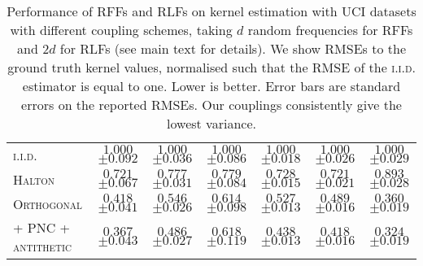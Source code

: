 \begin{table}[t!]
{\begin{tabular}{l c c c c c c}
 \midrule
\scshape{i.i.d.} & $1.000$ {\tiny $\pm 0.092$} & $1.000$ {\tiny $\pm 0.036$} & $1.000$ {\tiny $\pm 0.086$} & $1.000$ {\tiny $\pm 0.018$} & $1.000$ {\tiny $\pm 0.026$} & $1.000$ {\tiny $\pm 0.029$} \\
\scshape{Halton} & $0.721$ {\tiny $\pm 0.067$} & $0.777$ {\tiny $\pm 0.031$} & $0.779$ {\tiny $\pm 0.084$} & $0.728$ {\tiny $\pm 0.015$} & $0.721$ {\tiny $\pm 0.021$} & $0.893$ {\tiny $\pm 0.028$} \\
\scshape{Orthogonal} & $0.418$ {\tiny $\pm 0.041$} & $0.546$ {\tiny $\pm 0.026$} & $\mathbf{0.614}$ {\tiny $\pm 0.098$} & $0.527$ {\tiny $\pm 0.013$} & $0.489$ {\tiny $\pm 0.016$} & $0.360$ {\tiny $\pm 0.019$} \\
\scshape{+ PNC + antithetic} & $\mathbf{0.367}$ {\tiny $\pm 0.043$} & $\mathbf{0.486}$ {\tiny $\pm 0.027$} & $\mathbf{0.618}$ {\tiny $\pm 0.119$} & $\mathbf{0.438}$ {\tiny $\pm 0.013$} & $\mathbf{0.418}$ {\tiny $\pm 0.016$} & $\mathbf{0.324}$ {\tiny $\pm 0.019$} \\
\bottomrule
\end{tabular}
}
\vspace{1mm}
\caption{
    Performance of RFFs and RLFs on kernel estimation with UCI datasets with different coupling schemes, taking $d$ random frequencies for RFFs and $2d$ for RLFs (see main text for details).
    We show RMSEs to the ground truth kernel values, normalised such that the RMSE of the {\scshape i.i.d.} estimator is equal to one.
    Lower is better.
    Error bars are standard errors on the reported RMSEs.
    Our couplings consistently give the lowest variance.
} \vspace{-5mm}
\label{tab:rff}
\end{table}

